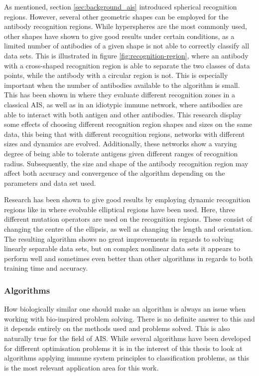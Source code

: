 As mentioned, section \ref{sec:background_ais} introduced spherical recognition regions. However, several other geometric shapes can be employed for the antibody recognition regions. While hyperspheres are the most commonly used, other shapes have shown to give good results under certain conditions, as a limited number of antibodies of a given shape is not able to correctly classify all data sets. This is illustrated in figure \ref{fig:recognition-region}, where an antibody with a cross-shaped recognition region is able to separate the two classes of data points, while the antibody with a circular region is not. This is especially important when the number of antibodies available to the algorithm is small. This has been shown in \cite{AIS:NotAllBallsAreRound} where they evaluate different recognition zones in a classical AIS, as well as in an idiotypic immune network, where antibodies are able to interact with both antigen and other antibodies. This research display some effects of choosing different recognition region shapes and sizes on the same data, this being that with different recognition regions, networks with different sizes and dynamics are evolved. Additionally, these networks show a varying degree of being able to tolerate antigens given different ranges of recognition radius. Subsequently, the size and shape of the antibody recognition region may affect both accuracy and convergence of the algorithm depending on the parameters and data set used. 


Research has been shown to give good results by employing dynamic recognition regions like in \cite{AIS:elipsis} where evolvable elliptical regions have been used. Here, three different mutation operators are used on the recognition regions. These consist of changing the centre of the ellipsis, as well as changing the length and orientation. The resulting algorithm shows no great improvements in regards to solving linearly separable data sets, but on complex nonlinear data sets it appears to perform well and sometimes even better than other algorithms in regards to both training time and accuracy.

\subsubsection{Algorithms}
How biologically similar one should make an algorithm is always an issue when working with bio-inspired problem solving. There is no definite answer to this and it depends entirely on the methods used and problems solved. This is also naturally true for the field of AIS. While several algorithms have been developed for different optimisation problems it is in the interest of this thesis to look at algorithms applying immune system principles to classification problems, as this is the most relevant application area for this work. 

